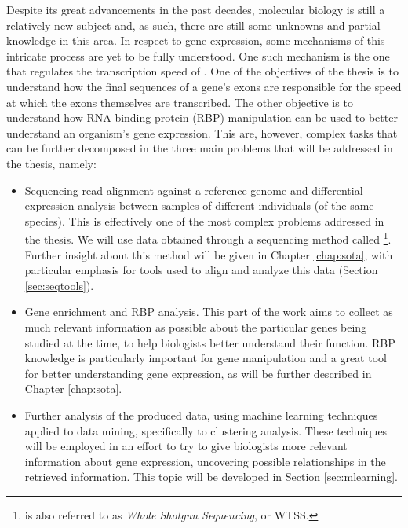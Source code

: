 Despite its great advancements in the past decades, molecular biology is still a
relatively new subject and, as such, there are still some unknowns and partial
knowledge in this area. In respect to gene expression, some mechanisms of this
intricate process are yet to be fully understood. One such mechanism is the one
that regulates the transcription speed of \rna. One of the objectives of the
thesis is to understand how the final sequences of a gene's exons are
responsible for the speed at which the exons themselves are transcribed. The
other objective is to understand how RNA binding protein (RBP) manipulation can
be used to better understand an organism's gene expression. This are, however,
complex tasks that can be further decomposed in the three main problems that
will be addressed in the thesis, namely:

\begin{itemize}

  \item
  Sequencing read alignment against a reference genome and differential
  expression analysis between samples of different individuals (of the same
  species). This is effectively one of the most complex problems addressed in
  the thesis. We will use data obtained through a sequencing method called
  \rnaseq{}\footnote{\rnaseq{} is also referred to as \textit{Whole \Trans{}
  Shotgun Sequencing}, or WTSS.}. Further insight about this method will be
  given in Chapter \ref{chap:sota}, with particular emphasis for tools used to
  align and analyze this data (Section \ref{sec:seqtools}).

  \item
  Gene enrichment and RBP analysis. This part of the work aims to collect as
  much relevant information as possible about the particular genes being studied
  at the time, to help biologists better understand their function. RBP
  knowledge is particularly important for gene manipulation and a great tool for
  better understanding gene expression, as will be further described in Chapter
  \ref{chap:sota}.

  \item
  Further analysis of the produced data, using machine learning techniques
  applied to data mining, specifically to clustering analysis. These techniques
  will be employed in an effort to try to give biologists more relevant
  information about gene expression, uncovering possible relationships in the
  retrieved information. This topic will be developed in Section
  \ref{sec:mlearning}.

\end{itemize}

